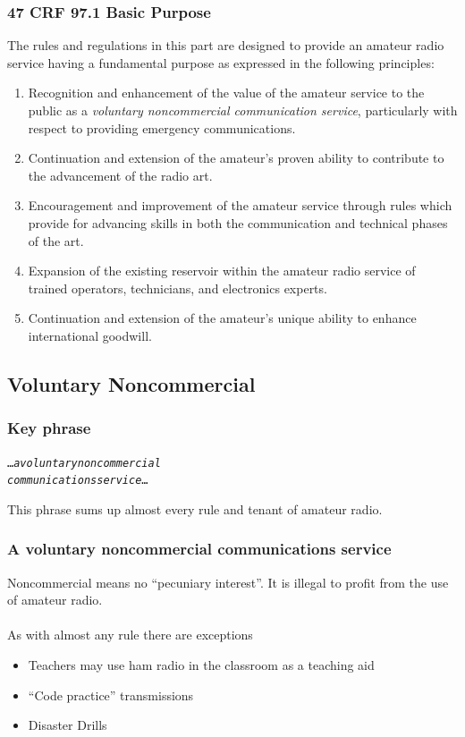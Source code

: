 \documentclass[10pt, handout]{beamer}
\begin{document}
\begin{frame}
\frametitle{47 CRF 97.1 Basic Purpose}
The rules and regulations in this part are designed to provide an amateur radio service having a fundamental purpose as expressed in the following principles:
\begin{enumerate}[A]
\scriptsize\item  Recognition and enhancement of the value of the amateur service to the public as a \emph{voluntary noncommercial communication service}, particularly with respect to providing emergency communications.\pause
\item Continuation and extension of the amateur's proven ability to contribute to the advancement of the radio art.\pause
\item Encouragement and improvement of the amateur service through rules which provide for advancing skills in both the communication and technical phases of the art.\pause
\item  Expansion of the existing reservoir within the amateur radio service of trained operators, technicians, and electronics experts. \pause
\item Continuation and extension of the amateur's unique ability to enhance international goodwill.
\end{enumerate}
\end{frame}

\subsection{Voluntary Noncommercial}

\begin{frame}
\frametitle{Key phrase}
\begin{alltt}
\ldots\emph{a voluntary noncommercial\\communications service}\ldots
\end{alltt}
This phrase sums up almost every rule and tenant of amateur radio.
\end{frame}

\begin{frame}
\frametitle{A voluntary noncommercial communications service}
Noncommercial means no ``pecuniary interest''. It is illegal to profit from the use of amateur radio.\\
\hfil \\As with almost any rule there are exceptions
\begin{itemize}
\item Teachers may use ham radio in the classroom as a teaching aid
\item ``Code practice'' transmissions
\item Disaster Drills
\end{itemize}
\end{frame}
\end{document}
